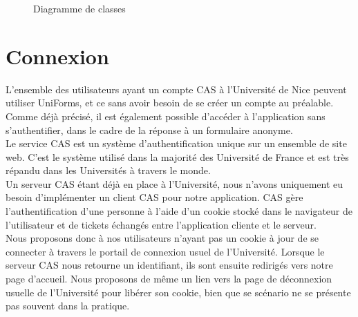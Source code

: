 \documentclass{sigplanconf}
\begin{document}
\begin{figure}
\begin{center}
\end{center}
\caption{Diagramme de classes}\label{diagrammeClasses}
\end{figure}

\section{Connexion}
L’ensemble des utilisateurs ayant un compte CAS à l’Université de Nice peuvent utiliser UniForms, et ce sans avoir besoin de se créer un compte au préalable. Comme déjà précisé, il est également possible d’accéder à l’application sans s’authentifier, dans le cadre de la réponse à un formulaire anonyme.\\

Le service CAS est un système d’authentification unique sur un ensemble de site web. C’est le système utilisé dans la majorité des Université de France et est très répandu dans les Universités à travers le monde.\\
Un serveur CAS étant déjà en place à l’Université, nous n’avons uniquement eu besoin d’implémenter un client CAS pour notre application. CAS gère l’authentification d’une personne à l’aide d’un cookie stocké dans le navigateur de l’utilisateur et de tickets échangés entre l’application cliente et le serveur.\\
Nous proposons donc à nos utilisateurs n’ayant pas un cookie à jour de se connecter à travers le portail de connexion usuel de l’Université. Lorsque le serveur CAS nous retourne un identifiant, ils sont ensuite redirigés vers notre page d’accueil. Nous proposons de même un lien vers la page de déconnexion usuelle de l’Université pour libérer son cookie, bien que se scénario ne se présente pas souvent dans la pratique.
\end{document}
